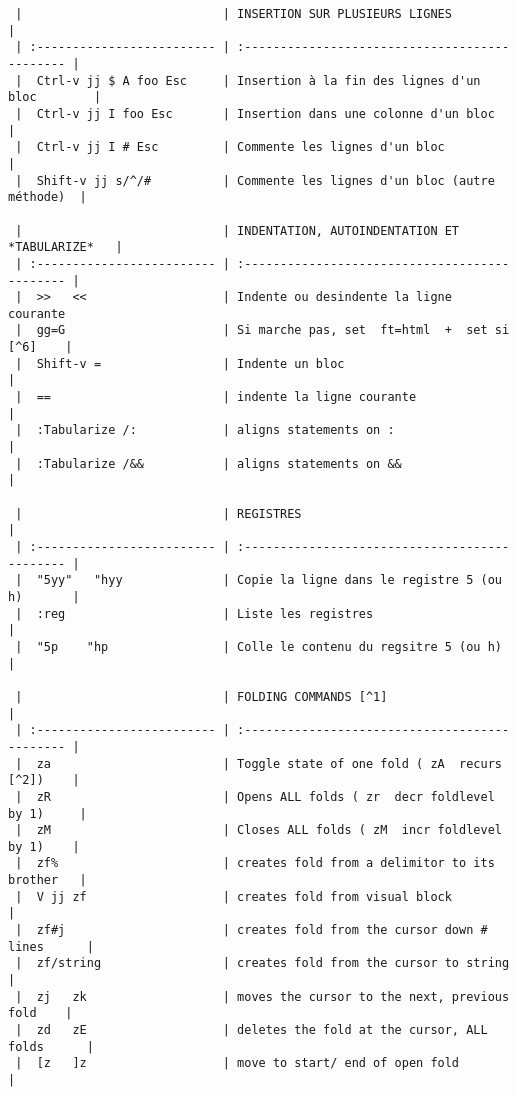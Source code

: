 \documentclass[10pt,landscape]{article}
\begin{document}
\begin{multicols}{2}
\begin{verbatim}
 |                            | INSERTION SUR PLUSIEURS LIGNES                 |
 | :------------------------- | :--------------------------------------------- |
 |  Ctrl-v jj $ A foo Esc     | Insertion à la fin des lignes d'un bloc        |
 |  Ctrl-v jj I foo Esc       | Insertion dans une colonne d'un bloc           |
 |  Ctrl-v jj I # Esc         | Commente les lignes d'un bloc                  |
 |  Shift-v jj s/^/#          | Commente les lignes d'un bloc (autre méthode)  |

 |                            | INDENTATION, AUTOINDENTATION ET *TABULARIZE*   |
 | :------------------------- | :--------------------------------------------- |
 |  >>   <<                   | Indente ou desindente la ligne courante
 |  gg=G                      | Si marche pas, set  ft=html  +  set si [^6]    |
 |  Shift-v =                 | Indente un bloc                                |
 |  ==                        | indente la ligne courante                      |
 |  :Tabularize /:            | aligns statements on :                         |
 |  :Tabularize /&&           | aligns statements on &&                        |

 |                            | REGISTRES                                      |
 | :------------------------- | :--------------------------------------------- |
 |  "5yy"   "hyy              | Copie la ligne dans le registre 5 (ou h)       |
 |  :reg                      | Liste les registres                            |
 |  "5p    "hp                | Colle le contenu du regsitre 5 (ou h)          |

 |                            | FOLDING COMMANDS [^1]                          |
 | :------------------------- | :--------------------------------------------- |
 |  za                        | Toggle state of one fold ( zA  recurs [^2])    |
 |  zR                        | Opens ALL folds ( zr  decr foldlevel by 1)     |
 |  zM                        | Closes ALL folds ( zM  incr foldlevel by 1)    |
 |  zf%                       | creates fold from a delimitor to its brother   |
 |  V jj zf                   | creates fold from visual block                 |
 |  zf#j                      | creates fold from the cursor down # lines      |
 |  zf/string                 | creates fold from the cursor to string         |
 |  zj   zk                   | moves the cursor to the next, previous fold    |
 |  zd   zE                   | deletes the fold at the cursor, ALL folds      |
 |  [z   ]z                   | move to start/ end of open fold                |


\end{verbatim}
\end{multicols}
\end{document}
